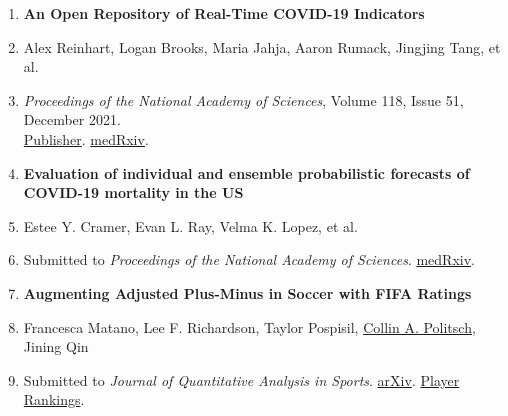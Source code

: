\documentclass[letterpaper,10pt]{article}
\begin{document}
\begin{enumerate}
\item \textbf{An Open Repository of Real-Time COVID-19 Indicators} 
\vspace{-0.25cm}
\item[] Alex Reinhart, Logan Brooks, Maria Jahja, Aaron Rumack, Jingjing Tang, et al.
\vspace{-0.25cm}
\item[] \emph{Proceedings of the National Academy of Sciences}, Volume 118, Issue 51, December 2021. \\\href{https://doi.org/10.1073/pnas.2111452118}{Publisher}. \href{https://www.medrxiv.org/content/10.1101/2021.07.12.21259660v1}{medRxiv}.
\vspace{0.15cm}

\item \textbf{Evaluation of individual and ensemble probabilistic forecasts of COVID-19 mortality in the US} 
\vspace{-0.25cm}
\item[] Estee Y. Cramer, Evan L. Ray, Velma K. Lopez, et al.
\vspace{-0.25cm}
\item[] Submitted to \emph{Proceedings of the National Academy of Sciences}. \href{https://www.medrxiv.org/content/10.1101/2021.02.03.21250974v2}{medRxiv}.
\vspace{0.15cm}


\item {\bf Augmenting Adjusted Plus-Minus in Soccer with FIFA Ratings}
\vspace{-0.25cm}
\item[] Francesca Matano, Lee F. Richardson, Taylor Pospisil, \underline{Collin A. Politsch}, Jining Qin
\vspace{-0.25cm}
\item[] {Submitted to {\it Journal of Quantitative Analysis in Sports}. \href{https://arxiv.org/abs/1810.08032}{arXiv}. \href{http://intraocular.net/}{Player Rankings}}.
\end{enumerate}
\end{document}

